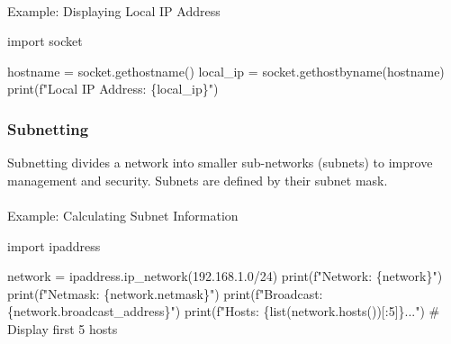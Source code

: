 \documentclass[
  letterpaper,
  DIV=11,
  numbers=noendperiod]{scrreprt}
\makeatletter
\let\oldparagraph\paragraph
\renewcommand{\paragraph}{
    \@ifstar
      \xxxParagraphStar
      \xxxParagraphNoStar
  }
\newcommand{\xxxParagraphStar}[1]{\oldparagraph*{#1}\mbox{}}
\newcommand{\xxxParagraphNoStar}[1]{\oldparagraph{#1}\mbox{}}
\newenvironment{Shaded}{\begin{snugshade}}{\end{snugshade}}
\newcommand{\BuiltInTok}[1]{\textcolor[rgb]{0.00,0.23,0.31}{#1}}
\newcommand{\CommentTok}[1]{\textcolor[rgb]{0.37,0.37,0.37}{#1}}
\newcommand{\DecValTok}[1]{\textcolor[rgb]{0.68,0.00,0.00}{#1}}
\newcommand{\ImportTok}[1]{\textcolor[rgb]{0.00,0.46,0.62}{#1}}
\newcommand{\NormalTok}[1]{\textcolor[rgb]{0.00,0.23,0.31}{#1}}
\newcommand{\OperatorTok}[1]{\textcolor[rgb]{0.37,0.37,0.37}{#1}}
\newcommand{\SpecialCharTok}[1]{\textcolor[rgb]{0.37,0.37,0.37}{#1}}
\newcommand{\SpecialStringTok}[1]{\textcolor[rgb]{0.13,0.47,0.30}{#1}}
\newcommand{\StringTok}[1]{\textcolor[rgb]{0.13,0.47,0.30}{#1}}
\makeatother
\begin{document}
\paragraph{Example: Displaying Local IP
Address}\label{example-displaying-local-ip-address}

\begin{Shaded}
\begin{Highlighting}[]
\ImportTok{import}\NormalTok{ socket}

\NormalTok{hostname }\OperatorTok{=}\NormalTok{ socket.gethostname()}
\NormalTok{local\_ip }\OperatorTok{=}\NormalTok{ socket.gethostbyname(hostname)}
\BuiltInTok{print}\NormalTok{(}\SpecialStringTok{f"Local IP Address: }\SpecialCharTok{\{}\NormalTok{local\_ip}\SpecialCharTok{\}}\SpecialStringTok{"}\NormalTok{)}
\end{Highlighting}
\end{Shaded}

\subsubsection{Subnetting}\label{subnetting}

Subnetting divides a network into smaller sub-networks (subnets) to
improve management and security. Subnets are defined by their subnet
mask.

\paragraph{Example: Calculating Subnet
Information}\label{example-calculating-subnet-information}

\begin{Shaded}
\begin{Highlighting}[]
\ImportTok{import}\NormalTok{ ipaddress}

\NormalTok{network }\OperatorTok{=}\NormalTok{ ipaddress.ip\_network(}\StringTok{\textquotesingle{}192.168.1.0/24\textquotesingle{}}\NormalTok{)}
\BuiltInTok{print}\NormalTok{(}\SpecialStringTok{f"Network: }\SpecialCharTok{\{}\NormalTok{network}\SpecialCharTok{\}}\SpecialStringTok{"}\NormalTok{)}
\BuiltInTok{print}\NormalTok{(}\SpecialStringTok{f"Netmask: }\SpecialCharTok{\{}\NormalTok{network}\SpecialCharTok{.}\NormalTok{netmask}\SpecialCharTok{\}}\SpecialStringTok{"}\NormalTok{)}
\BuiltInTok{print}\NormalTok{(}\SpecialStringTok{f"Broadcast: }\SpecialCharTok{\{}\NormalTok{network}\SpecialCharTok{.}\NormalTok{broadcast\_address}\SpecialCharTok{\}}\SpecialStringTok{"}\NormalTok{)}
\BuiltInTok{print}\NormalTok{(}\SpecialStringTok{f"Hosts: }\SpecialCharTok{\{}\BuiltInTok{list}\NormalTok{(network.hosts())[:}\DecValTok{5}\NormalTok{]}\SpecialCharTok{\}}\SpecialStringTok{..."}\NormalTok{)  }\CommentTok{\# Display first 5 hosts}
\end{Highlighting}
\end{Shaded}
\end{document}
